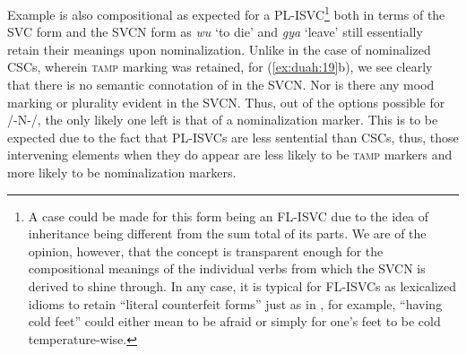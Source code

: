 \documentclass[output=paper
,newtxmath
,modfonts
,nonflat]{langsci/langscibook}
\begin{document}

Example  is also compositional as expected for a PL-ISVC\footnote{A case could be made for this form being an FL-ISVC due to the idea of inheritance being different from the sum total of its parts. We are of the opinion, however, that the concept is transparent enough for the compositional meanings of the individual verbs from which the SVCN is derived to shine through. In any case, it is typical for FL-ISVCs as lexicalized idioms to retain “literal counterfeit forms” just as in , for example, “having cold feet” could either mean to be afraid or simply for one’s feet to be cold temperature-wise.} both in terms of the SVC form and the SVCN form as \textit{wu} ‘to die’ and \textit{gya} ‘leave’ still essentially retain their meanings upon nominalization. Unlike in the case of nominalized CSCs, wherein \textsc{tamp} marking was retained, for (\ref{ex:duah:19}b), we see clearly that there is no semantic connotation of  in the SVCN. Nor is there any mood marking or plurality evident in the SVCN. Thus, out of the options possible for /-N-/, the only likely one left is that of a nominalization marker. This is to be expected due to the fact that PL-ISVCs are less sentential than CSCs, thus, those intervening elements when they do appear are less likely to be \textsc{tamp} markers and more likely to be nominalization markers.
\end{document}
